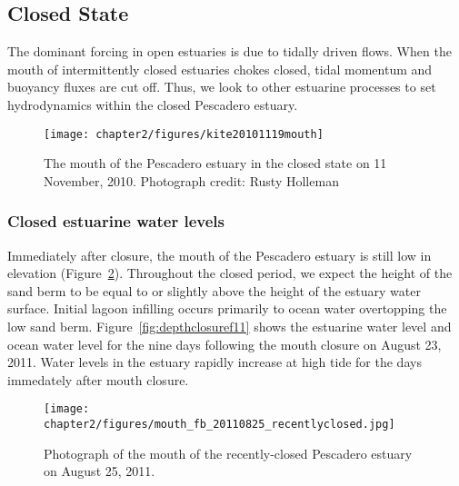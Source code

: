 \subsection{Closed State} \label{ssec:ClosedDynamics}

The dominant forcing in open estuaries is due to tidally driven flows. When the mouth of intermittently closed estuaries chokes closed, tidal momentum and buoyancy fluxes are cut off. Thus, we look to other estuarine processes to set hydrodynamics within the closed Pescadero estuary. 

\begin{figure}
	\begin{center}
		\texttt{[image: chapter2/figures/kite20101119mouth]} 
	\end{center}
\caption{The mouth of the Pescadero estuary in the closed state on 11 November, 2010.  Photograph credit: Rusty Holleman}\label{fig:kite_photos_closed} \end{figure}



\subsubsection{Closed estuarine water levels} \label{cl_wl}
Immediately after closure, the mouth of the Pescadero estuary is still low in elevation (Figure~\ref{fig:mouth_fb_20110825}). Throughout the closed period, we expect the height of the sand berm to be equal to or slightly above the height of the estuary water surface. Initial lagoon infilling occurs primarily to ocean water overtopping the low sand berm. Figure~\ref{fig:depthclosuref11} shows the estuarine water level and ocean water level for the nine days following the mouth closure on August 23, 2011. Water levels in the estuary rapidly increase at high tide for the days immedately after mouth closure.  


\begin{figure}
\centering
		\texttt{[image: chapter2/figures/mouth\_fb\_20110825\_recentlyclosed.jpg]} \caption{Photograph of the mouth of the recently-closed Pescadero estuary on August 25, 2011.} \label{fig:mouth_fb_20110825}
\end{figure}



